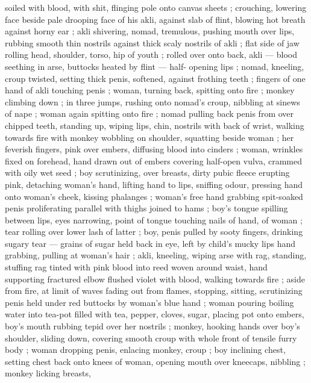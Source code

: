 soiled with blood, with shit, flinging pole onto canvas sheets ; 
crouching, lowering face beside pale drooping face of his akli, 
against slab of flint, blowing hot breath against horny ear ; akli 
shivering, nomad, tremulous, pushing mouth over lips, rubbing 
smooth thin nostrils against thick scaly nostrils of akli ; flat side of 
jaw rolling head, shoulder, torso, hip of youth ; rolled over onto back, 
akli --- blood seething in arse, buttocks heated by flint --- half- 
opening lips ; nomad, kneeling, croup twisted, setting thick penis, 
softened, against frothing teeth ; fingers of one hand of akli 
touching penis ; woman, turning back, spitting onto fire ; monkey 
climbing down ; in three jumps, rushing onto nomad's croup, nibbling 
at sinews of nape ; woman again spitting onto fire ; nomad pulling 
back penis from over chipped teeth, standing up, wiping lips, chin, 
nostrils with back of wrist, walking towards fire with monkey wobbling 
on shoulder, squatting beside woman ; her feverish fingers, pink over 
embers, diffusing blood into cinders ; woman, wrinkles fixed on 
forehead, hand drawn out of embers covering half-open vulva, 
crammed with oily wet seed ; boy scrutinizing, over breasts, dirty 
pubic fleece erupting pink, detaching woman's hand, lifting hand to 
lips, sniffing odour, pressing hand onto woman's cheek, kissing 
phalanges ; woman's free hand grabbing spit-soaked penis 
proliferating parallel with thighs joined to hams ; boy's tongue 
spilling between lips, eyes narrowing, point of tongue touching nails 
of hand, of woman ; tear rolling over lower lash of latter ; boy, penis 
pulled by sooty fingers, drinking sugary tear --- grains of sugar held 
back in eye, left by child's mucky lips {\dashcom} hand grabbing, pulling at 
woman's hair ; akli, kneeling, wiping arse with rag, standing, stuffing 
rag tinted with pink blood into reed woven around waist, hand 
supporting fractured elbow flushed violet with blood, walking 
towards fire ; aside from fire, at limit of waves fading out from 
flames, stopping, sitting, scrutinizing penis held under red buttocks 
by woman's blue hand ; woman pouring boiling water into tea-pot 
filled with tea, pepper, cloves, sugar, placing pot onto embers, boy's 
mouth rubbing tepid over her nostrils ; monkey, hooking hands over 
boy's shoulder, sliding down, covering smooth croup with whole front 
of tensile furry body ; woman dropping penis, enlacing monkey, 
croup ; boy inclining chest, setting chest back onto knees of woman, 
opening mouth over kneecaps, nibbling ; monkey licking breasts, 
